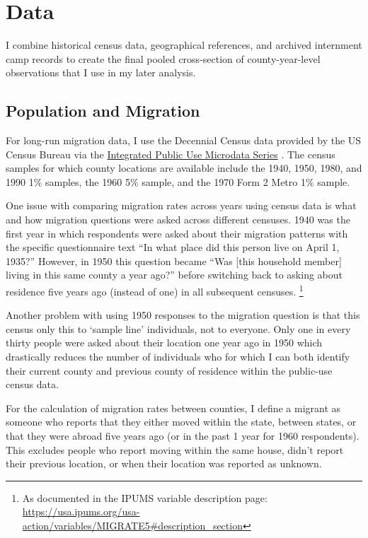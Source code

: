 \documentclass[12pt]{article}
\begin{document}
\section{Data}\label{data}

I combine historical census data, geographical references, and archived internment camp records to create the final pooled cross-section of county-year-level observations that I use in my later analysis. 

\subsection{Population and Migration}\label{population-and-migration}

For long-run migration data, I use the Decennial Census data provided by
the US Census Bureau via the
\href{https://usa.ipums.org/usa/index.shtml}{Integrated Public Use
Microdata Series} \citep{ruggles_ipums_2024}. The census
samples for which county locations are available include the 1940, 1950,
1980, and 1990 1\% samples, the 1960 5\% sample, and the 1970 Form 2
Metro 1\% sample.

One issue with comparing migration rates across years using census data is what and how migration questions were asked across different censuses.
1940 was the first year in which respondents were asked about their migration patterns with the specific questionnaire text
``In what place did this person live on April 1, 1935?''
However, in 1950 this question became
``Was [this household member] living in this same county a year ago?''
before switching back to asking about residence five years ago (instead of one) in all subsequent censuses.
\footnote{As documented in the IPUMS variable description page: \url{https://usa.ipums.org/usa-action/variables/MIGRATE5#description_section}}

Another problem with using 1950 responses to the migration question is that 
this census only this to `sample line' individuals, not to everyone.
Only one in every thirty people were asked about their location one year ago
in 1950 which drastically reduces the number of individuals who for which I can both 
identify their current county and previous county of residence within the public-use census data.

For the calculation of migration rates between counties, I define a
migrant as someone who reports that they either moved within the state,
between states, or that they were abroad five years ago (or in the past
1 year for 1960 respondents). This excludes people who report moving
within the same house, didn't report their previous location, or when their
location was reported as unknown.
\end{document}
